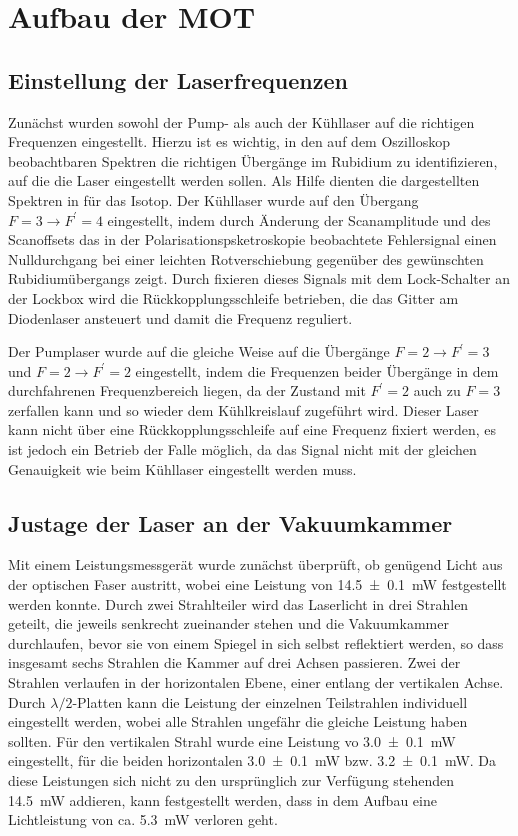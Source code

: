 \documentclass[11pt, a4paper]{article}
\numberwithin{equation}{section}
\begin{document}
\section{Aufbau der MOT}

\subsection{Einstellung der Laserfrequenzen}

Zunächst wurden sowohl der Pump- als auch der Kühllaser auf die richtigen Frequenzen eingestellt.
Hierzu ist es wichtig, in den auf dem Oszilloskop beobachtbaren Spektren die richtigen Übergänge im Rubidium zu identifizieren, auf die die Laser eingestellt werden sollen.
Als Hilfe dienten die dargestellten Spektren in \cite{anleitung} für das  Isotop.
Der Kühllaser wurde auf den Übergang $F=3 \rightarrow F^\prime=4$ eingestellt, indem durch Änderung der Scanamplitude und des Scanoffsets das in der Polarisationspsketroskopie beobachtete Fehlersignal einen Nulldurchgang bei einer leichten Rotverschiebung gegenüber des gewünschten Rubidiumübergangs zeigt.
Durch fixieren dieses Signals mit dem Lock-Schalter an der Lockbox wird die Rückkopplungsschleife betrieben, die das Gitter am Diodenlaser ansteuert und damit die Frequenz reguliert.

Der Pumplaser wurde auf die gleiche Weise auf die Übergänge $F=2 \rightarrow F^\prime=3$ und $F=2 \rightarrow F^\prime = 2$ eingestellt, indem die Frequenzen beider Übergänge in dem durchfahrenen Frequenzbereich liegen, da der Zustand mit $F^\prime = 2$ auch zu $F=3$ zerfallen kann und so wieder dem Kühlkreislauf zugeführt wird.
Dieser Laser kann nicht über eine Rückkopplungsschleife auf eine Frequenz fixiert werden, es ist jedoch ein Betrieb der Falle  möglich, da das Signal nicht mit der gleichen Genauigkeit wie beim Kühllaser eingestellt werden muss.

\subsection{Justage der Laser an der Vakuumkammer}

Mit einem Leistungsmessgerät wurde zunächst überprüft, ob genügend Licht aus der optischen Faser austritt, wobei eine Leistung von \SI{14,5 +- 0.1}{mW} festgestellt werden konnte.
Durch zwei Strahlteiler wird das Laserlicht in drei Strahlen geteilt, die jeweils senkrecht zueinander stehen und die Vakuumkammer durchlaufen, bevor sie von einem Spiegel in sich selbst reflektiert werden, so dass insgesamt sechs Strahlen die Kammer auf drei Achsen passieren.
Zwei der Strahlen verlaufen in der horizontalen Ebene, einer entlang der vertikalen Achse.
Durch $\lambda/2$-Platten kann die Leistung der einzelnen Teilstrahlen individuell eingestellt werden, wobei alle Strahlen ungefähr die gleiche Leistung haben sollten.
Für den vertikalen Strahl wurde eine Leistung vo \SI{3,0 +- 0.1}{mW} eingestellt, für die beiden horizontalen \SI{3,0 +- 0.1}{mW} bzw. \SI{3,2 +- 0.1}{mW}.
Da diese Leistungen sich nicht zu den ursprünglich zur Verfügung stehenden \SI{14,5}{mW} addieren, kann festgestellt werden, dass in dem Aufbau eine Lichtleistung von ca. \SI{5,3}{mW} verloren geht.
\end{document}
